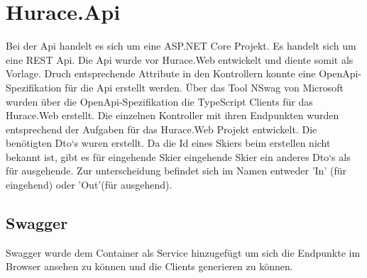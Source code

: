 \documentclass[a4paper, 12pt]{article}
\begin{document}
	\newpage
	
	\section{Hurace.Api}
	Bei der Api handelt es sich um eine ASP.NET Core Projekt. Es handelt sich um eine REST Api. Die Api wurde vor Hurace.Web entwickelt und diente somit als Vorlage. Druch entsprechende Attribute in den Kontrollern konnte eine OpenApi-Spezifikation für die Api erstellt werden. Über das Tool NSwag von Microsoft wurden über die OpenApi-Spezifikation die TypeScript Clients für das Hurace.Web erstellt. Die einzelnen Kontroller mit ihren Endpunkten wurden entsprechend der Aufgaben für das Hurace.Web Projekt entwickelt. Die benötigten Dto`s wuren erstellt. Da die Id eines Skiers beim erstellen nicht bekannt ist, gibt es für eingehende Skier eingehende Skier ein anderes Dto`s als für ausgehende. Zur unterscheidung befindet sich im Namen entweder 'In' (für eingehend) oder 'Out'(für ausgehend). 
	\subsection{Swagger}
	Swagger wurde dem Container als Service hinzugefügt um sich die Endpunkte im Browser ansehen zu können und die Clients generieren zu können.
\end{document}
